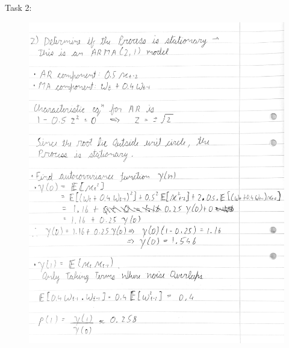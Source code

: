 \documentclass[a4paper,11pt]{article}
\begin{document}
    \newpage
    Task 2:    
    \begin{figure}[H]
        \centering
        \includegraphics[width=1\textwidth]{figure-markdown_strict/2-1.png}
        \label{fig:2}
    \end{figure}
\end{document}
